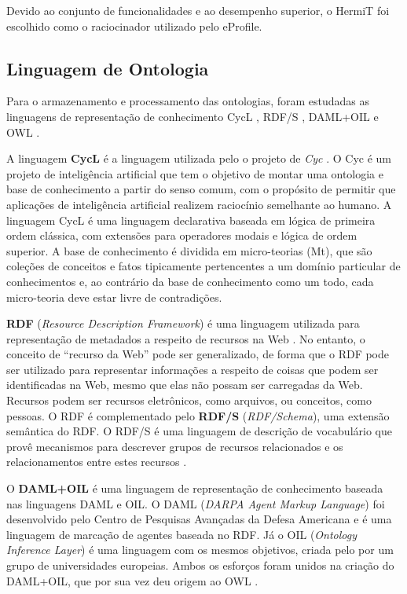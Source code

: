 Devido ao conjunto de funcionalidades e ao desempenho superior, o HermiT foi escolhido como o raciocinador utilizado pelo eProfile.


\subsection{Linguagem de Ontologia}
\label{sec:ling_ontologia}

Para o armazenamento e processamento das ontologias, foram estudadas as linguagens de representação de conhecimento CycL \cite{lenat89}, RDF/S \cite{rdfs}, DAML+OIL \cite{daconta03} e OWL \cite{daconta03}.

A linguagem \textbf{CycL} é a linguagem utilizada pelo o projeto de \emph{Cyc} \cite{lenat89}. O Cyc é um projeto de inteligência artificial que tem o objetivo de montar uma ontologia e base de conhecimento a partir do senso comum, com o propósito de permitir que aplicações de inteligência artificial realizem raciocínio semelhante ao humano. A linguagem CycL é uma linguagem declarativa baseada em lógica de primeira ordem clássica, com extensões para operadores modais e lógica de ordem superior. A base de conhecimento é dividida em micro-teorias (Mt), que são coleções de conceitos e fatos tipicamente pertencentes a um domínio particular de conhecimentos e, ao contrário da base de conhecimento como um todo, cada micro-teoria deve estar livre de contradições.

\textbf{RDF} (\emph{Resource Description Framework}) é uma linguagem utilizada para representação de metadados a respeito de recursos na Web \cite{rdf}. No entanto, o conceito de ``recurso da Web'' pode ser generalizado, de forma que o RDF pode ser utilizado para representar informações a respeito de coisas que podem ser identificadas na Web, mesmo que elas não possam ser carregadas da Web. Recursos podem ser recursos eletrônicos, como arquivos, ou conceitos, como pessoas. O RDF é complementado pelo \textbf{RDF/S} (\emph{RDF/Schema}), uma extensão semântica do RDF. O RDF/S é uma linguagem de descrição de vocabulário que provê mecanismos para descrever grupos de recursos relacionados e os relacionamentos entre estes recursos \cite{rdfs}.

O \textbf{DAML+OIL} é uma linguagem de representação de conhecimento baseada nas linguagens DAML e OIL. O DAML (\emph{DARPA Agent Markup Language}) foi desenvolvido pelo Centro de Pesquisas Avançadas da Defesa Americana e é uma linguagem de marcação de agentes baseada no RDF. Já o OIL (\emph{Ontology Inference Layer}) é uma linguagem com os mesmos objetivos, criada pelo por um grupo de universidades europeias. Ambos os esforços foram unidos na criação do DAML+OIL, que por sua vez deu origem ao OWL \cite{daconta03}.

